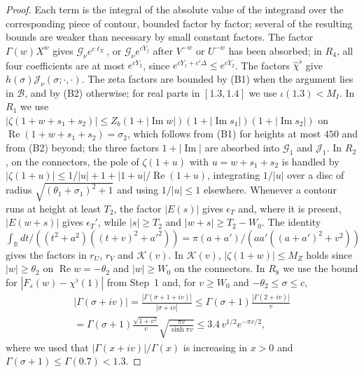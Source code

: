 \documentclass[11pt]{amsart}
\numberwithin{equation}{section}
\theoremstyle{definition}
\theoremstyle{remark}
\newcommand{\Rp}{\operatorname{Re}}
\newcommand{\Ip}{\operatorname{Im}}
\begin{document}
\begin{proof}
Each term is the integral of the absolute value of the integrand over the corresponding piece of contour, bounded factor by factor; several of the resulting bounds are weaker than necessary by small constant factors.
The factor $\Gamma(w)X^w$ gives $\mathcal G_\nu e^{c\ell_X}$, or $\mathcal G_\nu e^{cY_j}$ after $V^{-w}$ or $U^{-w}$ has been absorbed; in $R_4$, all four coefficients are at most $e^{cY_2}$, since $e^{cY_1 + c'\Delta} \leq e^{cY_2}$.
The factors $\hat\chi^\flat$ give $h(\sigma)\mathcal J_\nu(\sigma; \cdot, \cdot)$.
The zeta factors are bounded by (B1) when the argument lies in $\mathcal B$, and by (B2) otherwise; for real parts in $[1.3, 1.4]$ we use $\iota(1.3) < M_I$.
In $R_1$ we use $|\zeta(1 + w + s_1 + s_2)| \leq Z_b(1 + |\Ip w|)(1 + |\Ip s_1|)(1 + |\Ip s_2|)$ on $\Rp(1 + w + s_1 + s_2) = \sigma_2$, which follows from (B1) for heights at most $450$ and from (B2) beyond; the three factors $1 + |\Ip|$ are absorbed into $\mathcal G_1$ and $\mathcal J_1$.
In $R_2$, on the connectors, the pole of $\zeta(1 + u)$ with $u = w + s_1 + s_2$ is handled by $|\zeta(1 + u)| \leq 1/|u| + 1 + |1 + u|/\Rp(1 + u)$, integrating $1/|u|$ over a disc of radius $\sqrt{(\theta_1 + \sigma_1)^2 + 1}$ and using $1/|u| \leq 1$ elsewhere.
Whenever a contour runs at height at least $T_2$, the factor $|E(s)|$ gives $\epsilon_T$ and, where it is present, $|E(w + s)|$ gives $\epsilon_T'$, while $|s| \geq T_2$ and $|w + s| \geq T_2 - W_0$.
The identity $\int_{\mathbb R}dt/((t^2 + a^2)((t + v)^2 + a'^2)) = \pi(a + a')/(aa'((a + a')^2 + v^2))$ gives the factors in $r_U$, $r_V$ and $\mathcal K(v)$.
In $\mathcal K(v)$, $|\zeta(1 + w)| \leq M_Z$ holds since $|w| \geq \theta_2$ on $\Rp w = -\theta_2$ and $|w| \geq W_0$ on the connectors.
In $R_8$ we use the bound for $|F_s(w) - \chi^\flat(1)|$ from Step~1 and, for $v \geq W_0$ and $-\theta_2 \leq \sigma \leq c$,
\begin{multline*}
|\Gamma(\sigma + iv)| = \frac{|\Gamma(\sigma + 1 + iv)|}{|\sigma + iv|} \leq \Gamma(\sigma + 1)\frac{|\Gamma(2 + iv)|}{v}\\
= \Gamma(\sigma + 1)\frac{\sqrt{1 + v^2}}{v}\sqrt{\frac{\pi v}{\sinh\pi v}} \leq 3.4\,v^{1/2}e^{-\pi v/2},
\end{multline*}
where we used that $|\Gamma(x + iv)|/\Gamma(x)$ is increasing in $x > 0$ and $\Gamma(\sigma + 1) \leq \Gamma(0.7) < 1.3$.
\end{proof}
\end{document}
